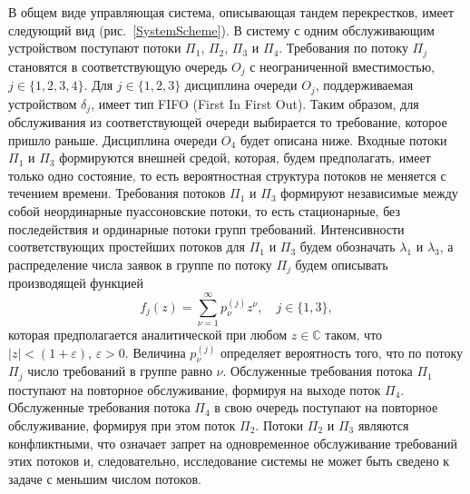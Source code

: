 \documentclass[11pt]{ubs}
\begin{document}
В общем виде управляющая система, описывающая тандем перекрестков, имеет следующий вид (рис.~\ref{SystemScheme}).
В систему с одним обслуживающим устройством поступают потоки $\Pi_1$, $\Pi_2$, $\Pi_3$  и $\Pi_4$. Требования по потоку $\Pi_j$ становятся в соответствующую очередь $O_j$ с неограниченной вместимостью, $j\in \{1, 2, 3, 4\}$. Для $j \in \{1, 2, 3\}$ дисциплина очереди $O_j$, поддерживаемая устройством $\delta_j$, имеет тип FIFO (First In First Out). Таким образом, для обслуживания из соответствующей очереди выбирается то требование, которое пришло раньше. Дисциплина очереди $O_4$ будет описана ниже. Входные потоки $\Pi_1$ и $\Pi_3$ формируются внешней средой, которая, будем предполагать, имеет только одно состояние, то есть вероятностная структура потоков не меняется с течением времени. Требования потоков $\Pi_1$ и $\Pi_3$ формируют независимые между собой неординарные пуассоновские потоки, то есть  стационарные, без последействия и ординарные потоки групп требований. Интенсивности соответствующих простейших потоков для $\Pi_1$ и $\Pi_3$ будем обозначать $\lambda_1$ и $\lambda_3$, а распределение числа заявок в группе по потоку $\Pi_j$ будем описывать производящей функцией
\begin{equation}
f_j(z) = \sum_{\nu=1}^{\infty} p_{\nu}^{(j)} z ^{\nu}, \quad j\in \{1,3\},
\label{GeneratingFunc}
\end{equation}
которая предполагается аналитической при любом $z\in \mathbb{C}$ таком, что $|z|<(1+\varepsilon)$, $\varepsilon>0$. Величина $p_{\nu}^{(j)}$ определяет вероятность того, что по потоку $\Pi_j$ число требований в группе равно $\nu$. Обслуженные требования потока $\Pi_1$ поступают на повторное обслуживание, формируя на выходе поток $\Pi_4$. Обслуженные требования потока $\Pi_4$ в свою очередь поступают на повторное обслуживание, формируя при этом поток $\Pi_2$. Потоки $\Pi_2$ и $\Pi_3$ являются конфликтными, что означает запрет на одновременное обслуживание требований этих потоков и, следовательно, исследование системы не может быть сведено к задаче с меньшим числом потоков. 
\end{document}
